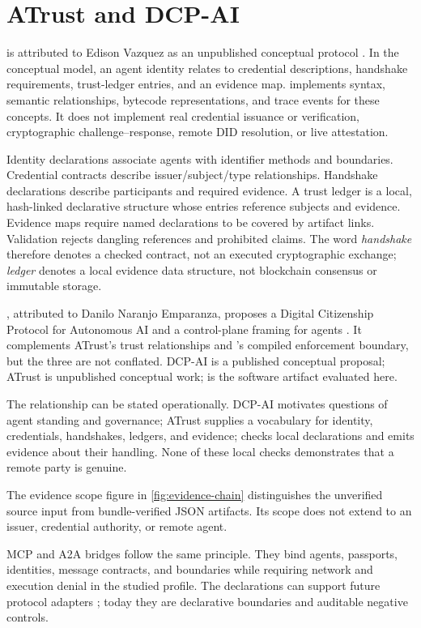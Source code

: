 \section{ATrust and DCP-AI}\label{sec:atrust}

\ATrust is attributed to Edison Vazquez as an unpublished conceptual protocol
\citep{vazquez_atrust}.  In the conceptual model, an agent identity relates to
credential descriptions, handshake requirements, trust-ledger entries, and an
evidence map.  \Argorix implements syntax, semantic relationships, bytecode
representations, and trace events for these concepts.  It does not implement
real credential issuance or verification, cryptographic challenge--response,
remote DID resolution, or live attestation.

Identity declarations associate agents with identifier methods and
boundaries.  Credential contracts describe issuer/subject/type relationships.
Handshake declarations describe participants and required evidence.  A trust
ledger is a local, hash-linked declarative structure whose entries reference
subjects and evidence.  Evidence maps require named declarations to be covered
by artifact links.  Validation rejects dangling references and prohibited
claims.  The word \emph{handshake} therefore denotes a checked contract, not an
executed cryptographic exchange; \emph{ledger} denotes a local evidence data
structure, not blockchain consensus or immutable storage.

\DCPAI, attributed to Danilo Naranjo Emparanza, proposes a Digital Citizenship
Protocol for Autonomous AI and a control-plane framing for agents
\citep{naranjo_dcpai}.  It complements ATrust's trust relationships and
\Argorix's compiled enforcement boundary, but the three are not conflated.
DCP-AI is a published conceptual proposal; ATrust is unpublished conceptual
work; \Argorix is the software artifact evaluated here.

The relationship can be stated operationally.  DCP-AI motivates questions of
agent standing and governance; ATrust supplies a vocabulary for identity,
credentials, handshakes, ledgers, and evidence; \Argorix checks local
declarations and emits evidence about their handling.  None of these local
checks demonstrates that a remote party is genuine.

The evidence scope figure in \cref{fig:evidence-chain} distinguishes the
unverified source input from bundle-verified JSON artifacts.  Its scope does
not extend to an issuer, credential authority, or remote agent.

MCP and A2A bridges follow the same principle.  They bind agents, passports,
identities, message contracts, and boundaries while requiring network and
execution denial in the studied profile.  The declarations can support future
protocol adapters \citep{mcp_spec_2025,a2a_spec}; today they are declarative
boundaries and auditable negative controls.
